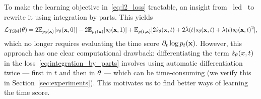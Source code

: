 To make the learning objective in~\eqref{eq:l2_loss} tractable, an insight from~\citet{hyvarinen2005scorematching} led~\citet{choi2022densityratio,Williams2024} to rewrite it using integration by parts. This yields
\begin{align}
\begin{split}
    \label{eq:integration_by_parts}
    \mathcal{L}_{\text{TSM}}(\operatorname{\mathbf{\theta}})
    =
    2 \mathbb{E}_{p_0(\operatorname{\mathbf{x}})}[s_{\operatorname{\mathbf{\theta}}}(\operatorname{\mathbf{x}}, 0)]
    -
    2 \mathbb{E}_{p_1(\operatorname{\mathbf{x}})}[s_{\operatorname{\mathbf{\theta}}}(\operatorname{\mathbf{x}}, 1)]
    + 
    \mathbb{E}_{p(t, \operatorname{\mathbf{x}})}
    [
    2 \dot{s}_{\operatorname{\mathbf{\theta}}}(\operatorname{\mathbf{x}}, t) 
    +
    2 \dot{\lambda}(t)
    s_{\operatorname{\mathbf{\theta}}}(\operatorname{\mathbf{x}}, t)
    +
    \lambda(t)
    s_{\operatorname{\mathbf{\theta}}}(\operatorname{\mathbf{x}}, t)^{2}
    ],
\end{split}
\end{align}
which no longer requires evaluating the time score $\partial_t \log p_t(\operatorname{\mathbf{x}})$. However, this approach has one clear computational drawback: differentiating the term $\dot{s}_{\operatorname{\mathbf{\theta}}}(x, t)$ in the loss~\eqref{eq:integration_by_parts} involves using automatic differentiation twice --- first in $t$ and then in $\operatorname{\mathbf{\theta}}$ --- which can be time-consuming (we verify this in Section~\ref{sec:experiments}). This motivates us to find better ways of learning the time score.


